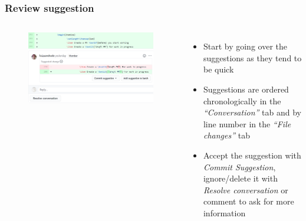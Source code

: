 \documentclass[aspectratio=169]{beamer} %
\begin{document}
\begin{frame}
	\frametitle{Review suggestion}
	\begin{columns}[c]

		\vspace{-.75cm}
		\begin{figure}
			\centering
			\includegraphics[width=\textwidth]{./img/review-suggestion-1.png}
		\end{figure}

		\begin{itemize}
			\setlength\itemsep{1em}
			\item Start by going over the suggestions as they tend to be quick
			\item Suggestions are ordered chronologically
			in the \textit{``Conversation''} tab and
			by line number in the \textit{``File changes''} tab
			\item Accept the suggestion with \textit{Commit Suggestion},
			ignore/delete it with \textit{Resolve conversation}
			or comment to ask for more information
		\end{itemize}

	\end{columns}
\end{frame}
\end{document}
